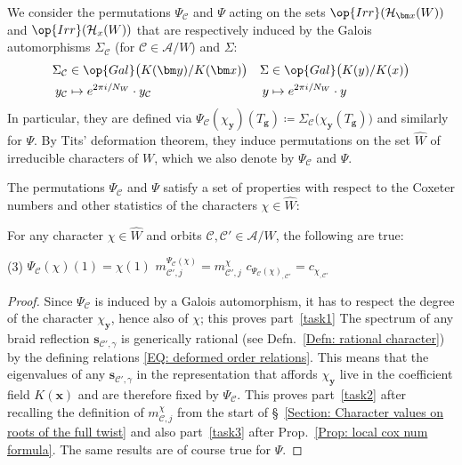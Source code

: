 \begin{defi}\label{Defn: Malle's character permutations}
We consider the permutations $\Psi_{\mathcal{C}}$ and $\Psi$ acting on the sets $\op{Irr}(\mathcal{H}_{\bm x}(W))$ and $\op{Irr}(\mathcal{H}_x(W))$ that are respectively induced by the Galois automorphisms $\Sigma_{\mathcal{C}}$ (for $\mathcal{C}\in\mathcal{A}/W$) and $\Sigma$:\begin{align*}
\Sigma_{\mathcal{C}}&\in\op{Gal}\big(K(\bm y)/K(\bm x)\big) &\Sigma &\in\op{Gal}\big(K(y)/K(x)\big)\\
y_{\mathcal{C}}&\mapsto e^{2\pi i/N_W}\cdot y_{\mathcal{C}} & y &\mapsto e^{2\pi i/N_W}\cdot y
\end{align*} 
In particular, they are defined via $\Psi_{\mathcal{C}}(\chi_{\bm y})(T_{\bm g})\coloneqq \Sigma_{\mathcal{C}}\big( \chi_{\bm y}(T_{\bm g})\big)$ and similarly for $\Psi$. By Tits' deformation theorem, they induce permutations on the set $\widehat{W}$ of irreducible characters of $W$, which we also denote by $\Psi_{\mathcal{C}}$ and $\Psi$.
\end{defi}

The permutations $\Psi_{\mathcal{C}}$ and $\Psi$ satisfy a set of properties with respect to the Coxeter numbers and other statistics of the characters $\chi\in\widehat{W}$:

\begin{prop}\label{Prop: properties of Psi for Cox numbers}
For any character $\chi\in\widehat{W}$ and orbits $\mathcal{C},\mathcal{C}'\in\mathcal{A}/W$, the following are true:
\begin{tasks}[style=enumerate, after-item-skip=4mm](3)
\task $\displaystyle\Psi_{\mathcal{C}}(\chi)(1)=\chi(1)$\label{task1}
\task $\displaystyle m^{\Psi_{\mathcal{C}}(\chi)}_{\mathcal{C}',j}=m^{\chi}_{\mathcal{C}',j}$\label{task2}
\task $\displaystyle c_{\Psi_{\mathcal{C}}(\chi)_{,\mathcal{C}'}}=c_{\chi_{,\mathcal{C}'}}$\label{task3}
\end{tasks}
\end{prop}
\begin{proof}
Since $\Psi_{\mathcal{C}}$ is induced by a Galois automorphism, it has to respect the degree of the character $\chi_{\bm y}$, hence also of $\chi$; this proves part~\ref{task1} The spectrum of any braid reflection $\bm s_{\mathcal{C}',\gamma}$ is generically rational (see Defn.~\ref{Defn: rational character}) by the defining relations \eqref{EQ: deformed order relations}. This means that the eigenvalues of any $\bm s_{\mathcal{C}',\gamma}$ in the representation that affords $\chi_{\bm y}$ live in the coefficient field $K(\bm x)$ and are therefore fixed by $\Psi_{\mathcal{C}}$. This proves part~\ref{task2} after recalling the definition of $m^{\chi}_{\mathcal{C},j}$ from the start of \S~\ref{Section: Character values on roots of the full twist} and also part~\ref{task3} after Prop.~\ref{Prop: local cox num formula}. The same results are of course true for $\Psi$.
\end{proof}

